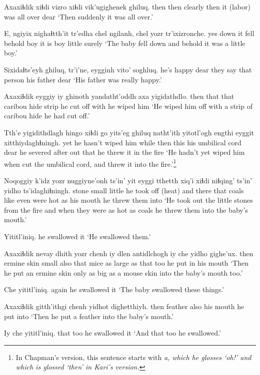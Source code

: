 \documentclass[12pt]{article}
\begin{document}
\gll Axaxiɬdik xiɬdi vizro  xiɬdi vik'ugighenek ghiluq.
then then clearly then {it (labor) was all over} dear
\glt `Then suddenly it was all over.'
\glend

\gll E, ngiyix nighaɬtth'it tr'edha chel ngilanh, chel yozr tr'ixizronche.
yes down  {it fell} behold  boy {it is}  boy little surely
\glt `The baby fell down and behold it was a little boy.'
\glend

\gll Sixidaɬts'eyh ghiluq, tr'i'ne, eygginh vito'  soghluq.
{he's happy} dear {they say} {that person} {his father} dear
\glt `His father was really happy.'
\glend

\gll Axaxiɬdik eyggiy iy ghinoth yandatht'oddh axa yigidathdlo.
then that that {caribou hide} {strip he cut off} with {he wiped him}
\glt `He wiped him off with a strip of caribou hide he had cut off.'
\glend

\gll Tth'e yigidithdlagh hingo xiɬdi go yits'eg ghiluq natht'ith yitotl'ogh engthi eyggit xitthiydaghɬningh.
yet {he hasn't wiped him} while then this {his umbilical cord} dear {he severed} after  out  that {he threw it in the fire}
\glt `He hadn't yet wiped him when cut the umbilical cord, and threw it into the fire.'\footnote{In Chapman's version, this sentence starts with \em a, \em which he glosses `oh!' and which is glossed `then' in Kari's version.}
\glend

\gll Noqoggiy k'idz yozr {nuggiyne'onh} ts'in' yit eyggi tthetth xiq'i xiɬdi niɬqing' ts'in' yidho ts'idaghiɬningh.
stone  small little {he took off (heat)} and there that coals like even {were hot as} {} {his mouth} {he threw them into} 
\glt `He took out the little stones from the fire and when they were as hot as coals he threw them into the baby's mouth.'
\glend

\gll Yititl'iniq.
{{he swallowed it}}
\glt `He swallowed them.'
\glend

\gll Axaxiɬdik nevay dhith yozr chenh iy dlen antidlchogh iy che {yidho gighe'ux.}
then ermine  skin small also that mice {as large as} that too {he put in his mouth} 
\glt `Then he put an ermine skin only as big as a mouse skin into the baby's mouth too.'
\glend

\gll Che yititl'iniq.
again {he swallowed it}
\glt `The baby swallowed these things.'
\glend

\gll Axaxiɬdik gitth'ithgi chenh yidhot dighetthiyh.
then  feather  also {his mouth} {he put into}
\glt `Then he put a feather into  the baby's mouth.'
\glend

\gll Iy che yititl'iniq.
that too {he swallowed it}
\glt `And that too he swallowed.'
\glend
\end{document}
